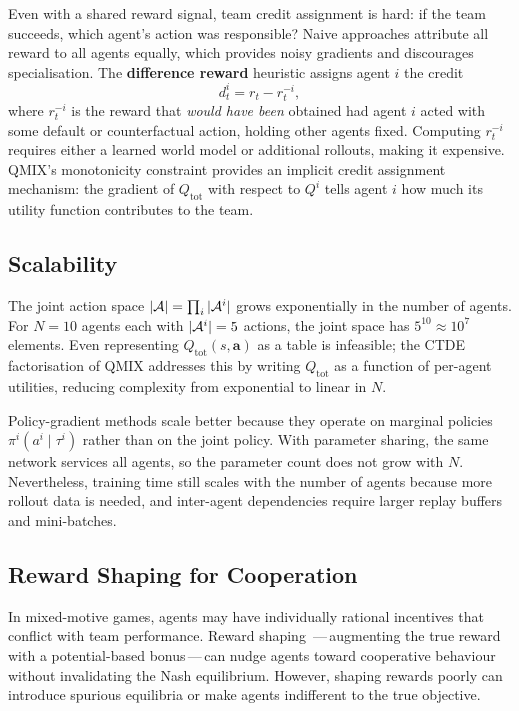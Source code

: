Even with a shared reward signal, team credit assignment is
hard: if the team succeeds, which
agent's action was responsible? Naive approaches attribute all reward
to all agents equally, which provides noisy gradients and discourages
specialisation. The \textbf{difference reward}
heuristic assigns agent $i$ the credit
\[
  d^i_t = r_t - r_t^{-i},
\]
where $r_t^{-i}$ is the reward that \emph{would have been} obtained
had agent $i$ acted with some default or counterfactual action,
holding other agents fixed. Computing $r_t^{-i}$ requires either a
learned world model or additional rollouts, making it expensive.
QMIX's monotonicity constraint provides an implicit credit assignment
mechanism: the gradient of $Q_\mathrm{tot}$ with respect to $Q^i$
tells agent $i$ how much its utility function contributes to the team.

\subsection{Scalability}

The joint action space $|\mathcal{A}| = \prod_i |\mathcal{A}^i|$ grows exponentially
in the number of agents. For $N = 10$ agents each with $|\mathcal{A}^i| = 5$
actions, the joint space has $5^{10} \approx 10^7$ elements. Even
representing $Q_\mathrm{tot}(s, \bm{a})$ as a table is infeasible;
the CTDE factorisation of QMIX addresses this by writing
$Q_\mathrm{tot}$ as a function of per-agent utilities, reducing
complexity from exponential to linear in $N$.

Policy-gradient methods scale better because they operate on
marginal policies $\pi^i(a^i \mid \tau^i)$ rather than on the joint
policy. With parameter sharing, the same network services all agents,
so the parameter count does not grow with $N$. Nevertheless,
training time still scales with the number of agents because more
rollout data is needed, and inter-agent dependencies require larger
replay buffers and mini-batches.

\subsection{Reward Shaping for Cooperation}

In mixed-motive games, agents may have individually rational
incentives that conflict with team performance. Reward shaping
\,---\,augmenting the true reward
with a potential-based bonus\,---\,can nudge agents toward
cooperative behaviour without invalidating the Nash equilibrium.
However, shaping rewards poorly can introduce spurious equilibria
or make agents indifferent to the true objective.

